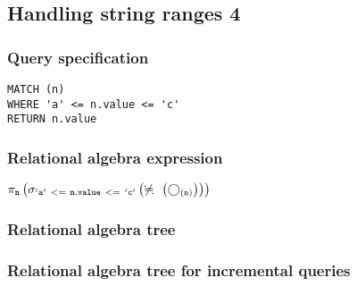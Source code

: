 \subsection{Handling string ranges 4}

\subsubsection*{Query specification}

\begin{lstlisting}
MATCH (n)
WHERE 'a' <= n.value <= 'c'
RETURN n.value
\end{lstlisting}

\subsubsection*{Relational algebra expression}

$\projection{\var{n}} \left(\selection{\mathtt{'a'~<=~n.value~<=~'c'}} \left(\alldifferent{} \left(\getvertices{n}{}\right)\right)\right)$

\subsubsection*{Relational algebra tree}


\subsubsection*{Relational algebra tree for incremental queries}


